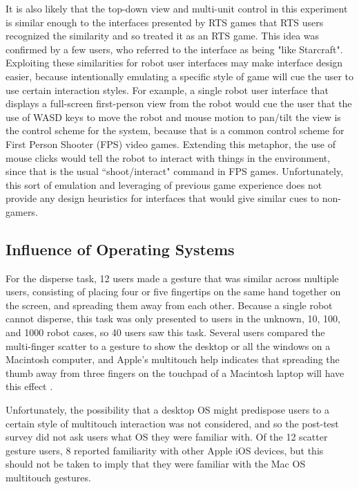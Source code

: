 It is also likely that the top-down view and multi-unit control in this experiment is similar enough to the interfaces presented by RTS games that RTS users recognized the similarity and so treated it as an RTS game.
This idea was confirmed by a few users, who referred to the interface as being "like Starcraft". 
Exploiting these similarities for robot user interfaces may make interface design easier, because intentionally emulating a specific style of game will cue the user to use certain interaction styles. 
For example, a single robot user interface that displays a full-screen first-person view from the robot would cue the user that the use of WASD keys to move the robot and mouse motion to pan/tilt the view is the control scheme for the system, because that is a common control scheme for First Person Shooter (FPS) video games. 
Extending this metaphor, the use of mouse clicks would tell the robot to interact with things in the environment, since that is the usual ``shoot/interact" command in FPS games. 
Unfortunately, this sort of emulation and leveraging of previous game experience does not provide any design heuristics for interfaces that would give similar cues to non-gamers. 

\subsection{Influence of Operating Systems}

For the disperse task, 12 users made a gesture that was similar across multiple users, consisting of placing four or five fingertips on the same hand together on the screen, and spreading them away from each other. 
Because a single robot cannot disperse, this task was only presented to users in the unknown, 10, 100, and 1000 robot cases, so 40 users saw this task. 
Several users compared the multi-finger scatter to a gesture to show the desktop or all the windows on a Macintosh computer, and Apple's multitouch help indicates that spreading the thumb away from three fingers on the touchpad of a Macintosh laptop will have this effect \citep{AppleTouchpadHelp}. 

Unfortunately, the possibility that a desktop OS might predispose users to a certain style of multitouch interaction was not considered, and so the post-test survey did not ask users what OS they were familiar with. Of the 12 scatter gesture users, 8 reported familiarity with other Apple iOS devices, but this should not be taken to imply that they were familiar with the Mac OS multitouch gestures. 

